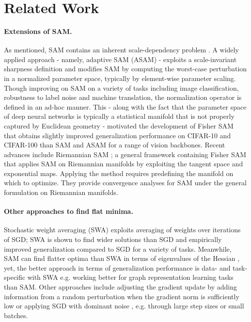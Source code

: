 \section{Related Work}
\paragraph{Extensions of SAM.} As mentioned, SAM contains an inherent scale-dependency problem \cite{dinh2017sharp}. A widely applied approach \cite{kwon2021asam} - namely, adaptive SAM (ASAM) - exploits a scale-invariant sharpness definition and modifies SAM by computing the worst-case perturbation in a normalized parameter space, typically by element-wise parameter scaling. Though improving on SAM on a variety of tasks including image classification, robustness to label noise and machine translation, the normalization operator is defined in an ad-hoc manner. This - along with the fact that the parameter space of deep neural networks is typically a statistical manifold that is not properly captured by Euclidean geometry - motivated the development of Fisher SAM \cite{kim2022fisher} that obtains slightly improved generalization performance on CIFAR-10 and CIFAR-100 than SAM and ASAM for a range of vision backbones. Recent advances include Riemannian SAM \cite{yun2024riemannian}; a general framework containing Fisher SAM that applies SAM on Riemannian manifolds by exploiting the tangent space and exponential maps. Applying the method requires predefining the manifold on which to optimize. They provide convergence analyses for SAM under the general formulation on Riemannian manifolds.



\paragraph{Other approaches to find flat minima.} 
Stochastic weight averaging (SWA) \cite{izmailov2018averaging} exploits averaging of weights over iterations of SGD; SWA is shown to find wider solutions than SGD and empirically improved generalization compared to SGD for a variety of tasks. Meanwhile, SAM can find flatter optima than SWA in terms of eigenvalues of the Hessian \cite{kaddour2022flat}, yet, the better approach in terms of generalization performance is data- and task-specific with SWA e.g. working better for graph representation learning tasks than SAM. Other approaches include adjusting the gradient update by adding information from a random perturbation when the gradient norm is sufficiently low \cite{ahn2023escape} or applying SGD with dominant noise \cite{keskar2016large, jastrzkebski2017three, xing2018walk, zhu2018anisotropic, smith2020generalization, zhang2021understanding}, e.g. through large step sizes or small batches.


